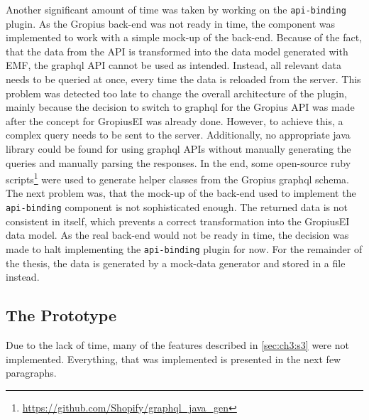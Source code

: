 Another significant amount of time was taken by working on the \lstinline|api-binding| plugin.
As the \gls{Gropius} back-end was not ready in time, the component was implemented to work with a simple mock-up of the back-end.
Because of the fact, that the data from the \gls{API} is transformed into the data model generated with \gls{EMF}, 
the \gls{graphql} \gls{API} cannot be used as intended.
Instead, all relevant data needs to be queried at once, every time the data is reloaded from the server.
This problem was detected too late to change the overall architecture of the plugin, 
mainly because the decision to switch to \gls{graphql} for the \gls{Gropius} \gls{API} was made after the concept for \gls{GropiusEI} was already done.
However, to achieve this, a complex query needs to be sent to the server.
Additionally, no appropriate \gls{java} library could be found for using \gls{graphql} \glspl{API} without manually generating the queries and manually parsing the responses. 
In the end, some open-source ruby scripts\footnote{\url{https://github.com/Shopify/graphql_java_gen}} were used to generate helper classes from the \gls{Gropius} \gls{graphql} schema.
The next problem was, that the mock-up of the back-end used to implement the \lstinline|api-binding| component is not sophisticated enough.
The returned data is not consistent in itself, which prevents a correct transformation into the \gls{GropiusEI} data model.
As the real back-end would not be ready in time, the decision was made to halt implementing the \lstinline|api-binding| plugin for now.
For the remainder of the thesis, the data is generated by a mock-data generator and stored in a file instead.

\subsection{The Prototype}
Due to the lack of time, many of the features described in \cref{sec:ch3:s3} were not implemented.
Everything, that was implemented is presented in the next few paragraphs.


